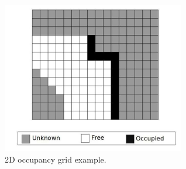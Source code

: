 \begin{figure}[H]
    \centering
    \includegraphics[width=\linewidth]{assets/2_7.png}
    \caption{2D occupancy grid example.}
    \label{fig:2.7}
\end{figure}
